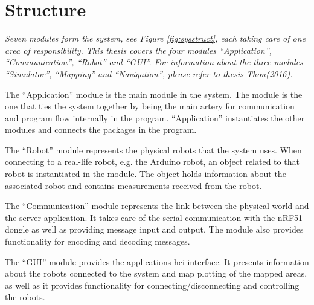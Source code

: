 \section{Structure}
\label{secr:structure}
\textit{Seven modules form the system, see Figure \ref{fig:sysstruct}, each taking care of one area of responsibility. This thesis covers the four modules ``Application'', ``Communication'', ``Robot'' and ``GUI''. For information about the three modules ``Simulator'', ``Mapping'' and ``Navigation'', please refer to thesis Thon(2016).}

The ``Application'' module is the main module in the system. The module is the one that ties the system together by being the main artery for communication and program flow internally in the program. ``Application'' instantiates the other modules and connects the packages in the program.

The ``Robot'' module represents the physical robots that the system uses. When connecting to a real-life robot, e.g. the Arduino robot, an object related to that robot is instantiated in the module. The object holds information about the associated robot and contains measurements received from the robot.

The ``Communication'' module represents the link between the physical world and the server application. It takes care of the serial communication with the nRF51-dongle as well as providing message input and output. The module also provides functionality for encoding and decoding messages.

The ``GUI'' module provides the applications \acrshort{hci} interface. It presents information about the robots connected to the system and map plotting of the mapped areas, as well as it provides functionality for connecting/disconnecting and controlling the robots.

